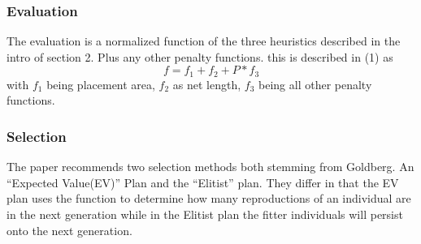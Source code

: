 \documentclass{article}
\begin{document}
\subsubsection{Evaluation}
The evaluation is a normalized function of the three heuristics described in the intro of section 2. Plus any other penalty functions. this is described in (1) as \begin{equation}
     f = f_1 + f_2 + P * f_3
\end{equation}
with $f_1$ being placement area, $f_2$ as net length, $f_3$ being all other penalty functions. 

\subsubsection{Selection}
The paper recommends two selection methods both stemming from Goldberg. An ``Expected Value(EV)'' Plan and the ``Elitist'' plan. They differ in that the EV plan uses the function to determine how many reproductions of an individual are in the next generation while in the Elitist plan the fitter individuals will persist onto the next generation.
\end{document}
